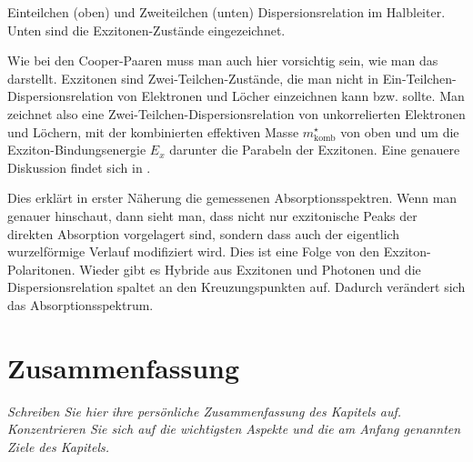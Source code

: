 \begin{marginfigure}

    \vspace*{3mm}


    \caption{Einteilchen (oben) und Zweiteilchen (unten) Dispersionsrelation im Halbleiter. Unten sind die Exzitonen-Zustände eingezeichnet.}
\end{marginfigure}

Wie bei den Cooper-Paaren muss man auch hier vorsichtig sein, wie man das darstellt. Exzitonen sind Zwei-Teilchen-Zustände, die man nicht in Ein-Teilchen-Dispersionsrelation von Elektronen und Löcher einzeichnen kann bzw. sollte. Man zeichnet also eine Zwei-Teilchen-Dispersionsrelation von unkorrelierten Elektronen und Löchern, mit der kombinierten effektiven Masse $ m^\star_\text{komb}$ von oben und um die Exziton-Bindungsenergie $E_x$ darunter die Parabeln der Exzitonen. Eine genauere Diskussion findet sich in \cite{yu_cardona}.

Dies erklärt in erster Näherung die gemessenen Absorptionsspektren. Wenn man genauer hinschaut, dann sieht man, dass nicht nur exzitonische Peaks der direkten Absorption vorgelagert sind, sondern dass auch der eigentlich wurzelförmige Verlauf modifiziert wird. Dies ist eine Folge von den Exziton-Polaritonen. Wieder gibt es Hybride aus Exzitonen und Photonen und die Dispersionsrelation spaltet an den Kreuzungspunkten auf. Dadurch verändert sich das Absorptionsspektrum.





\newpage
\section{Zusammenfassung}

\textit{Schreiben Sie hier ihre persönliche Zusammenfassung des Kapitels auf. Konzentrieren Sie sich auf die wichtigsten Aspekte und die am Anfang genannten Ziele des Kapitels.}

\vspace*{10cm}
\printbibliography[segment=\therefsegment,heading=subbibliography]
